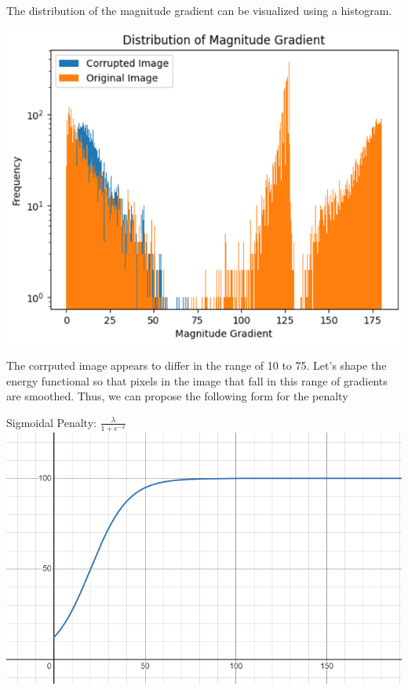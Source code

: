 \documentclass{article}
\begin{document}
  \newpage
  \noindent
  The distribution of the magnitude gradient can be visualized using a histogram.
  \begin{center}
    \includegraphics[scale=0.5]{../report_images/gradient.png}
  \end{center}
  \vspace{12pt}

  \noindent
  The corrputed image appears to differ in the range of 10 to 75.
  Let's shape the energy functional so that pixels in the image that
  fall in this range of gradients are smoothed. Thus, we
  can propose the following form for the penalty
  \begin{center}
    Sigmoidal Penalty: $\frac{\lambda}{1+e^{-x}}$\\
    \vspace{12pt}
    \includegraphics[scale=0.5]{../report_images/sigmoid.png}
  \end{center}
  \vspace{12pt}
\end{document}
